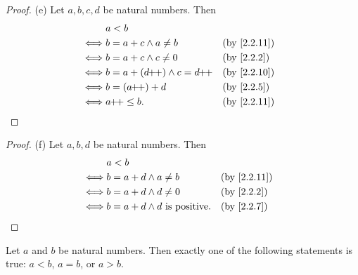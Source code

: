 \begin{proof}{(e)}
  Let \(a, b, c, d\) be natural numbers.
  Then
  \begin{align*}
         & a < b                                                        \\
    \iff & b = a + c \land a \neq b      &  & \text{(by \cref{2.2.11})} \\
    \iff & b = a + c \land c \neq 0      &  & \by{2.2.2}                \\
    \iff & b = a + (d\pp) \land c = d\pp &  & \text{(by \cref{2.2.10})} \\
    \iff & b = (a\pp) + d                &  & \by{2.2.5}                \\
    \iff & a\pp \leq b.                  &  & \text{(by \cref{2.2.11})}
  \end{align*}
\end{proof}

\begin{proof}{(f)}
  Let \(a, b, d\) be natural numbers.
  Then
  \begin{align*}
         & a < b                                                                 \\
    \iff & b = a + d \land a \neq b               &  & \text{(by \cref{2.2.11})} \\
    \iff & b = a + d \land d \neq 0               &  & \by{2.2.2}                \\
    \iff & b = a + d \land d \text{ is positive}. &  & \by{2.2.7}
  \end{align*}
\end{proof}

\begin{prop}\label{2.2.13}
  Let \(a\) and \(b\) be natural numbers.
  Then exactly one of the following statements is true: \(a < b\), \(a = b\), or \(a > b\).
\end{prop}


